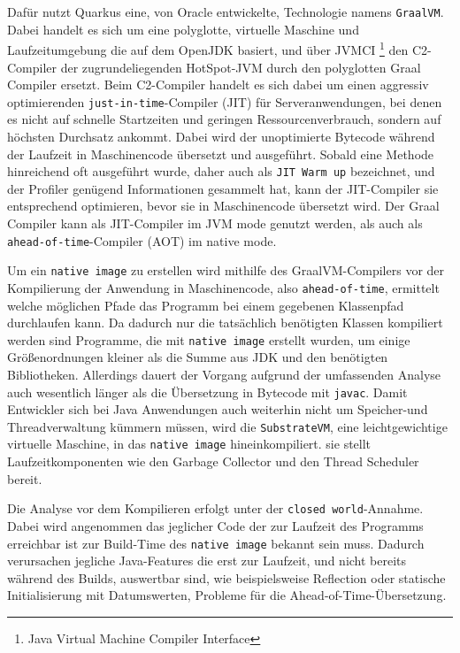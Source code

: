 Dafür nutzt Quarkus eine, von Oracle entwickelte, Technologie namens \verb|GraalVM|.
Dabei handelt es sich um eine polyglotte, virtuelle Maschine und Laufzeitumgebung die auf dem OpenJDK basiert, und über
JVMCI \footnote{Java Virtual Machine Compiler Interface} den C2-Compiler der zugrundeliegenden HotSpot-JVM durch den
polyglotten Graal Compiler ersetzt.\parencite{GraalVM}
Beim C2-Compiler handelt es sich dabei um einen aggressiv optimierenden \verb|just-in-time|-Compiler (JIT) für Serveranwendungen, bei denen es nicht auf
schnelle Startzeiten und geringen Ressourcenverbrauch, sondern auf höchsten Durchsatz ankommt.
Dabei wird der unoptimierte Bytecode während der Laufzeit in Maschinencode übersetzt und ausgeführt. Sobald eine Methode hinreichend oft
ausgeführt wurde, daher auch als \verb|JIT Warm up| bezeichnet, und der Profiler genügend Informationen gesammelt hat, kann der JIT-Compiler
sie entsprechend optimieren, bevor sie in Maschinencode übersetzt wird.
Der Graal Compiler kann als JIT-Compiler im JVM mode genutzt werden, als auch als \verb|ahead-of-time|-Compiler (AOT) im native mode.\newline

Um ein \verb|native image| zu erstellen wird mithilfe des GraalVM-Compilers vor der Kompilierung der Anwendung in Maschinencode, also \verb|ahead-of-time|,
ermittelt welche möglichen Pfade das Programm bei einem gegebenen Klassenpfad durchlaufen kann. Da dadurch nur die tatsächlich benötigten Klassen
kompiliert werden sind Programme, die mit \verb|native image| erstellt wurden, um einige Größenordnungen kleiner als die Summe aus
JDK und den benötigten Bibliotheken.
Allerdings dauert der Vorgang aufgrund der umfassenden Analyse auch wesentlich länger als die Übersetzung in Bytecode mit \verb|javac|.
Damit Entwickler sich bei Java Anwendungen auch weiterhin nicht um Speicher-und Threadverwaltung kümmern müssen, wird die \verb|SubstrateVM|, eine
leichtgewichtige virtuelle Maschine, in das \verb|native image| hineinkompiliert.
sie stellt Laufzeitkomponenten wie den Garbage Collector und den Thread Scheduler bereit.

Die Analyse vor dem Kompilieren erfolgt unter der \verb|closed world|-Annahme. Dabei wird angenommen das jeglicher Code der zur Laufzeit des Programms
erreichbar ist zur Build-Time des \verb|native image| bekannt sein muss. Dadurch verursachen jegliche Java-Features die erst zur Laufzeit,
und nicht bereits während des Builds,
auswertbar sind, wie beispielsweise Reflection oder statische Initialisierung mit Datumswerten, Probleme für die Ahead-of-Time-Übersetzung.

